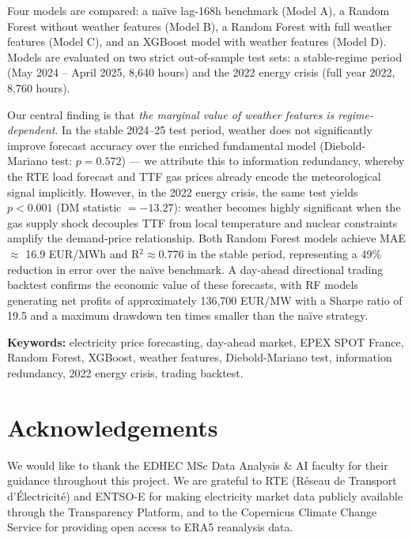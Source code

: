 \documentclass[12pt, a4paper, oneside]{report}
\begin{document}
Four models are compared: a na\"{i}ve lag-168h benchmark (Model A), a Random
Forest without weather features (Model B), a Random Forest with full weather
features (Model C), and an XGBoost model with weather features (Model D).
Models are evaluated on two strict out-of-sample test sets: a stable-regime
period (May 2024 -- April 2025, 8,640 hours) and the 2022 energy crisis
(full year 2022, 8,760 hours).

Our central finding is that \textit{the marginal value of weather features
is regime-dependent}. In the stable 2024--25 test period, weather does not
significantly improve forecast accuracy over the enriched fundamental model
(Diebold-Mariano test: $p = 0.572$) — we attribute this to information
redundancy, whereby the RTE load forecast and TTF gas prices already encode
the meteorological signal implicitly. However, in the 2022 energy crisis, the
same test yields $p < 0.001$ (DM statistic $= -13.27$): weather becomes
highly significant when the gas supply shock decouples TTF from local
temperature and nuclear constraints amplify the demand-price relationship.
Both Random Forest models achieve MAE $\approx$ 16.9 EUR/MWh and
R$^2 \approx 0.776$ in the stable period, representing a 49\% reduction in
error over the na\"{i}ve benchmark. A day-ahead directional trading backtest
confirms the economic value of these forecasts, with RF models generating net
profits of approximately 136,700 EUR/MW with a Sharpe ratio of 19.5 and a
maximum drawdown ten times smaller than the na\"{i}ve strategy.

\vspace{1em}
\noindent\textbf{Keywords:} electricity price forecasting, day-ahead market,
EPEX SPOT France, Random Forest, XGBoost, weather features, Diebold-Mariano
test, information redundancy, 2022 energy crisis, trading backtest.

\chapter*{Acknowledgements}

We would like to thank the EDHEC MSc Data Analysis \& AI faculty for their guidance throughout this project. We are grateful to RTE (R\'{e}seau de Transport d'Électricit\'{e}) and ENTSO-E for making electricity market data publicly available through the Transparency Platform, and to the Copernicus Climate Change Service for providing open access to ERA5 reanalysis data.
\end{document}
